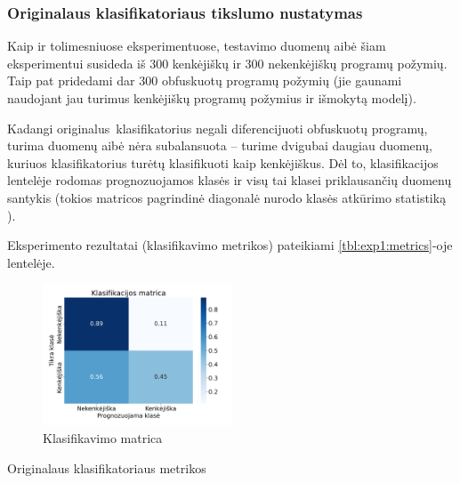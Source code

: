 \subsubsection{Originalaus klasifikatoriaus tikslumo nustatymas}\label{sec:exp:1}

Kaip ir tolimesniuose eksperimentuose, testavimo duomenų aibė šiam
eksperimentui susideda iš 300 kenkėjiškų ir 300 nekenkėjiškų programų požymių.
Taip pat pridedami dar 300 obfuskuotų programų požymių (jie gaunami naudojant
jau turimus kenkėjiškų programų požymius ir išmokytą \MALGAN modelį).

Kadangi originalus\footnotemark~klasifikatorius negali diferencijuoti obfuskuotų programų,
turima duomenų aibė nėra subalansuota -- turime dvigubai daugiau duomenų,
kuriuos klasifikatorius turėtų klasifikuoti kaip kenkėjiškus. Dėl to,
klasifikacijos lentelėje  rodomas prognozuojamos klasės
ir visų tai klasei priklausančių duomenų santykis (tokios matricos pagrindinė
diagonalė nurodo klasės atkūrimo statistiką ).

Eksperimento rezultatai (klasifikavimo metrikos) pateikiami \ref{tbl:exp1:metrics}-oje lentelėje.
\begin{figure}[h]
    \centering
    \includegraphics[width=0.5\textwidth]{images/normal_2x2.png}
    \caption{Klasifikavimo matrica}
    \label{fig:exp1:confusion}
\end{figure}

\begin{table}[h]
    \caption{Originalaus klasifikatoriaus metrikos}
    \centering
    \label{tbl:exp1:metrics}
\end{table}

